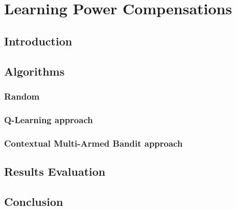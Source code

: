 \chapter{Learning Power Compensations}

\section{Introduction}

\section{Algorithms}

\subsection{Random}

\subsection{Q-Learning approach}

\subsection{Contextual Multi-Armed Bandit approach}

\section{Results Evaluation}

\section{Conclusion}